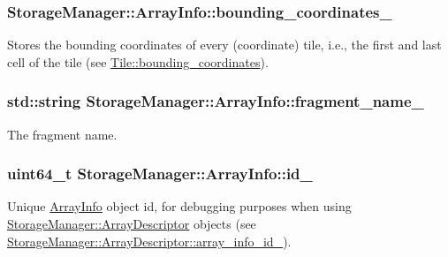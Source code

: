 \subsubsection[{bounding\+\_\+coordinates\+\_\+}]{ Storage\+Manager\+::\+Array\+Info\+::bounding\+\_\+coordinates\+\_\+}\label{structStorageManager_1_1ArrayInfo_a1826af77bebd82f8f6996633893016ae}
Stores the bounding coordinates of every (coordinate) tile, i.\+e., the first and last cell of the tile (see \hyperlink{classTile_a310b5f9321c9c8ea569c04f5d540ee39}{Tile\+::bounding\+\_\+coordinates}). \hypertarget{structStorageManager_1_1ArrayInfo_a48f16de429210120242a73cc1bd79e6d}{}
\subsubsection[{fragment\+\_\+name\+\_\+}]{\setlength{\rightskip}{0pt plus 5cm}std\+::string Storage\+Manager\+::\+Array\+Info\+::fragment\+\_\+name\+\_\+}\label{structStorageManager_1_1ArrayInfo_a48f16de429210120242a73cc1bd79e6d}
The fragment name. \hypertarget{structStorageManager_1_1ArrayInfo_a03f7d3a19af3b09d8ea5577b1605639f}{}
\subsubsection[{id\+\_\+}]{\setlength{\rightskip}{0pt plus 5cm}uint64\+\_\+t Storage\+Manager\+::\+Array\+Info\+::id\+\_\+}\label{structStorageManager_1_1ArrayInfo_a03f7d3a19af3b09d8ea5577b1605639f}
Unique \hyperlink{structStorageManager_1_1ArrayInfo}{Array\+Info} object id, for debugging purposes when using \hyperlink{classStorageManager_1_1ArrayDescriptor}{Storage\+Manager\+::\+Array\+Descriptor} objects (see \hyperlink{classStorageManager_1_1ArrayDescriptor_a78e3c352bcedee5707141275a4cbf17d}{Storage\+Manager\+::\+Array\+Descriptor\+::array\+\_\+info\+\_\+id\+\_\+}). \hypertarget{structStorageManager_1_1ArrayInfo_ad8a93fcfecfefc7a9d784f2474cc8683}{}
